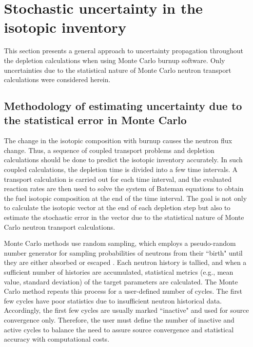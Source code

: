\section{Stochastic uncertainty in the isotopic inventory} 
\label{sec:uq-stochastic}
This section presents a general approach to uncertainty propagation throughout 
the depletion calculations when using Monte Carlo burnup software. Only 
uncertainties due to the statistical nature of Monte Carlo neutron transport 
calculations were considered herein. 

\subsection{Methodology of estimating uncertainty due to the statistical error 
in Monte Carlo}
The change in the isotopic composition with burnup causes the neutron flux 
change. Thus, a sequence of coupled transport problems and depletion 
calculations should be done to predict the isotopic inventory accurately. In 
such coupled calculations, the depletion time is divided into a few time 
intervals. A transport calculation is carried out for each time interval, and 
the evaluated reaction rates are then used to solve the system of Bateman 
equations to obtain the fuel isotopic composition at the end 
of the time interval. The goal is not only to calculate the isotopic vector at 
the end of each depletion step but also to estimate the stochastic error in 
the vector due to the statistical nature of Monte Carlo neutron transport 
calculations.

Monte Carlo methods use random sampling, which employs a pseudo-random 
number generator for sampling probabilities of neutrons from their ``birth" 
until they are either absorbed or escaped \cite{brown_fundamentals_2005}. Each 
neutron history is tallied, and when a sufficient number of histories are 
accumulated, statistical metrics (e.g., mean value, standard deviation) of the 
target parameters are calculated. The Monte Carlo method repeats this process 
for a user-defined number of cycles. The first few cycles have poor statistics 
due to insufficient neutron historical data. 
Accordingly, the first few cycles are usually marked ``inactive" and used for 
source convergence only. Therefore, the user must define the number of 
inactive and active cycles to balance the need to assure source convergence 
and statistical accuracy with computational costs.

